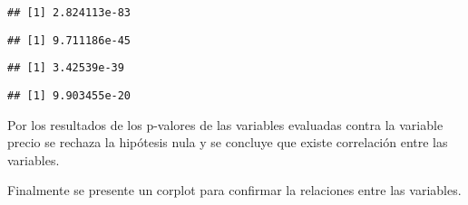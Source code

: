 \documentclass[
]{article}
\newenvironment{Shaded}{\begin{snugshade}}{\end{snugshade}}
\newcommand{\AttributeTok}[1]{\textcolor[rgb]{0.77,0.63,0.00}{#1}}
\newcommand{\ConstantTok}[1]{\textcolor[rgb]{0.00,0.00,0.00}{#1}}
\newcommand{\FunctionTok}[1]{\textcolor[rgb]{0.00,0.00,0.00}{#1}}
\newcommand{\NormalTok}[1]{#1}
\newcommand{\SpecialCharTok}[1]{\textcolor[rgb]{0.00,0.00,0.00}{#1}}
\newcommand{\StringTok}[1]{\textcolor[rgb]{0.31,0.60,0.02}{#1}}
\begin{document}
\begin{verbatim}
## [1] 2.824113e-83
\end{verbatim}

\begin{Shaded}
\end{Shaded}

\begin{verbatim}
## [1] 9.711186e-45
\end{verbatim}

\begin{Shaded}
\end{Shaded}

\begin{verbatim}
## [1] 3.42539e-39
\end{verbatim}

\begin{Shaded}
\end{Shaded}

\begin{verbatim}
## [1] 9.903455e-20
\end{verbatim}

Por los resultados de los p-valores de las variables evaluadas contra la
variable precio se rechaza la hipótesis nula y se concluye que existe
correlación entre las variables.

Finalmente se presente un corplot para confirmar la relaciones entre las
variables.
\end{document}
